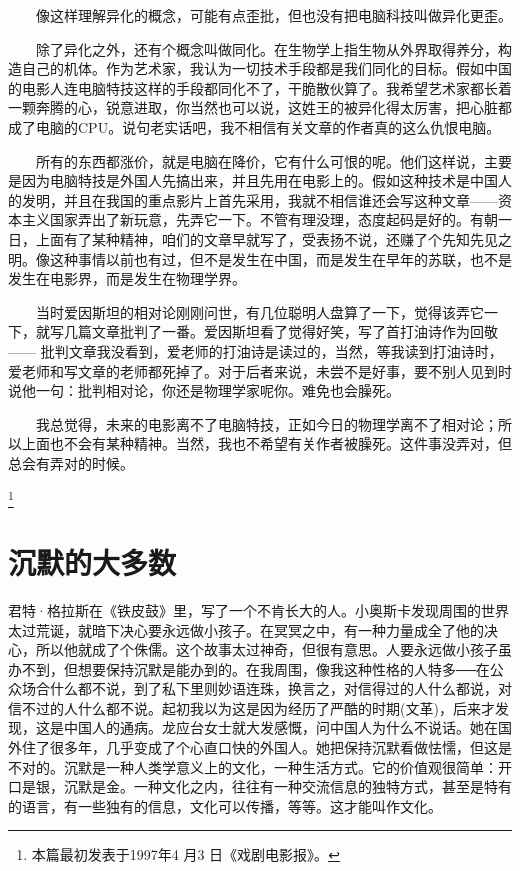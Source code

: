 　　像这样理解异化的概念，可能有点歪批，但也没有把电脑科技叫做异化更歪。 

　　除了异化之外，还有个概念叫做同化。在生物学上指生物从外界取得养分，构造自己的机体。作为艺术家，我认为一切技术手段都是我们同化的目标。假如中国的电影人连电脑特技这样的手段都同化不了，干脆散伙算了。我希望艺术家都长着一颗奔腾的心，锐意进取，你当然也可以说，这姓王的被异化得太厉害，把心脏都成了电脑的CPU。说句老实话吧，我不相信有关文章的作者真的这么仇恨电脑。 

　　所有的东西都涨价，就是电脑在降价，它有什么可恨的呢。他们这样说，主要是因为电脑特技是外国人先搞出来，并且先用在电影上的。假如这种技术是中国人的发明，并且在我国的重点影片上首先采用，我就不相信谁还会写这种文章——资本主义国家弄出了新玩意，先弄它一下。不管有理没理，态度起码是好的。有朝一日，上面有了某种精神，咱们的文章早就写了，受表扬不说，还赚了个先知先见之明。像这种事情以前也有过，但不是发生在中国，而是发生在早年的苏联，也不是发生在电影界，而是发生在物理学界。 

　　当时爱因斯坦的相对论刚刚问世，有几位聪明人盘算了一下，觉得该弄它一下，就写几篇文章批判了一番。爱因斯坦看了觉得好笑，写了首打油诗作为回敬—— 批判文章我没看到，爱老师的打油诗是读过的，当然，等我读到打油诗时，爱老师和写文章的老师都死掉了。对于后者来说，未尝不是好事，要不别人见到时说他一句：批判相对论，你还是物理学家呢你。难免也会臊死。 

　　我总觉得，未来的电影离不了电脑特技，正如今日的物理学离不了相对论；所以上面也不会有某种精神。当然，我也不希望有关作者被臊死。这件事没弄对，但总会有弄对的时候。 


\footnote{本篇最初发表于1997年4 月3 日《戏剧电影报》。}

\chapter{沉默的大多数}

君特·格拉斯在《铁皮鼓》里，写了一个不肯长大的人。小奥斯卡发现周围的世界太过荒诞，就暗下决心要永远做小孩子。在冥冥之中，有一种力量成全了他的决心，所以他就成了个侏儒。这个故事太过神奇，但很有意思。人要永远做小孩子虽办不到，但想要保持沉默是能办到的。在我周围，像我这种性格的人特多──在公众场合什么都不说，到了私下里则妙语连珠，换言之，对信得过的人什么都说，对信不过的人什么都不说。起初我以为这是因为经历了严酷的时期(文革)，后来才发现，这是中国人的通病。龙应台女士就大发感慨，问中国人为什么不说话。她在国外住了很多年，几乎变成了个心直口快的外国人。她把保持沉默看做怯懦，但这是不对的。沉默是一种人类学意义上的文化，一种生活方式。它的价值观很简单：开口是银，沉默是金。一种文化之内，往往有一种交流信息的独特方式，甚至是特有的语言，有一些独有的信息，文化可以传播，等等。这才能叫作文化。 

